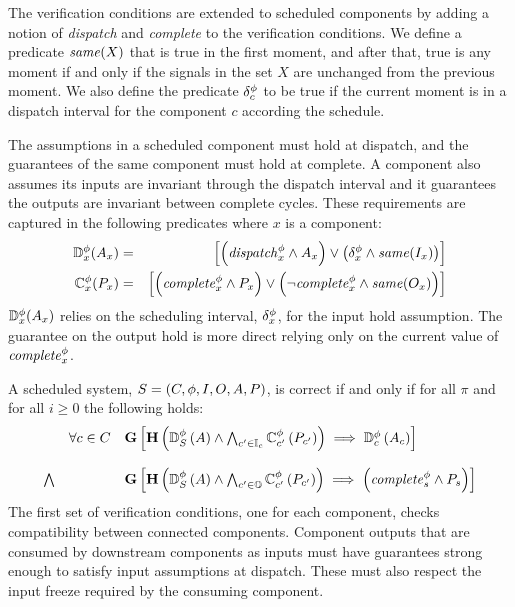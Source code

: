 The verification conditions are extended to scheduled components by adding a notion of \textit{dispatch} and \textit{complete} to the verification conditions.
We define a predicate $\mathit{same}(X)$ that is true in the first moment, and after that, true is any moment if and only if the signals in the set $X$ are unchanged from the previous moment.
We also define the predicate $\delta^\phi_c$ to be true if the current moment is in a dispatch interval for the component $c$ according the schedule.

The assumptions in a scheduled component must hold at dispatch, and the guarantees of the same component must hold at complete.
A component also assumes its inputs are invariant through the dispatch interval and it guarantees the outputs are invariant between complete cycles.
These requirements are captured in the following predicates where $x$ is a component:
\begin{eqnarray*}
  \mathbb{D}^\phi_x(A_x) &=& \left[\left(\mathit{dispatch}^{\phi}_x \wedge A_x\right) \vee \left(\delta^\phi_x \wedge \mathit{same}(I_x)\right)\right] \\
  \mathbb{C}^\phi_x(P_x) &=& \left[\left(\mathit{complete}^{\phi}_x \wedge P_x\right) \vee \left(\neg\mathit{complete}^{\phi}_x \wedge \mathit{same}(O_x)\right)\right] \\
\end{eqnarray*}
$\mathbb{D}^\phi_x(A_x)$ relies on the scheduling interval, $\delta^\phi_x$, for the input hold assumption.
The guarantee on the output hold is more direct relying only on the current value of $\mathit{complete}^{\phi}_x$.

A scheduled system, $S = (C, \phi, I, O, A, P)$, is correct if and only if for all $\pi$ and for all $i \ge 0$ the following holds:
\[
\begin{array}{lll}
        & \forall c \in C &  
            \mathbf{G}\left[\mathbf{H}\left(\mathbb{D}^\phi_S\left(A\right) \wedge 
            \bigwedge_{c^\prime \in \mathbb{I}_c} \mathbb{C}^\phi_{c^\prime}\left(P_{c^\prime}\right)\right) 
            \implies \mathbb{D}^\phi_c\left(A_c\right)\right] \\ \\
 \bigwedge &   & 
            \mathbf{G}\left[\mathbf{H}\left(\mathbb{D}^\phi_S\left(A\right) \wedge 
            \bigwedge_{c^\prime \in \mathbb{O}} \mathbb{C}^\phi_{c^\prime}\left(P_{c^\prime}\right)\right)
            \implies \left(\mathit{complete}^{\phi}_s \wedge P_s\right)\right]
\end{array}
\]
The first set of verification conditions, one for each component, checks compatibility between connected components.
Component outputs that are consumed by downstream components as inputs must have guarantees strong enough to satisfy input assumptions at dispatch.
These must also respect the input freeze required by the consuming component.

